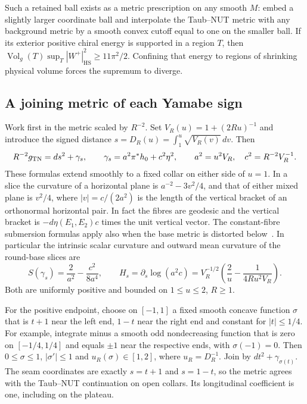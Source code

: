 \documentclass[11pt]{article}
\numberwithin{equation}{section}
\theoremstyle{definition}
\theoremstyle{remark}
\DeclareMathOperator{\Vol}{Vol}
\newcommand{\HS}{\mathrm{HS}}
\begin{document}
Such a retained ball exists as a metric prescription on any smooth
\(M\): embed a slightly larger coordinate ball and interpolate the
Taub--NUT metric with any background metric by a smooth convex cutoff
equal to one on the smaller ball. If its exterior positive chiral energy
is supported in a region \(T\), then
\(\Vol_g(T)\sup_T |W^+|_{\HS}^2\ge11\pi^2/2\). Confining that energy
to regions of shrinking physical volume forces the supremum to diverge.

\subsection{A joining metric of each Yamabe sign}

Work first in the metric scaled by \(R^{-2}\). Set \(V_R(u)=1+(2Ru)^{-1}\) and introduce the signed distance
\(s=D_R(u)=\int_1^u\sqrt{V_R(v)}\,dv\). Then
\[
 R^{-2}g_{\rm TN}=ds^2+\gamma_s,\qquad
 \gamma_s=a^2\pi^*h_0+c^2\eta^2,\qquad
 a^2=u^2V_R,\quad c^2=R^{-2}V_R^{-1}.
\]
These formulas extend smoothly to a fixed collar on either side
of \(u=1\). In a slice the curvature of a horizontal plane is
\(a^{-2}-3v^2/4\), and that of either mixed plane is \(v^2/4\),
where \(|v|=c/(2a^2)\) is the length of the vertical bracket of
an orthonormal horizontal pair. In fact the fibres are geodesic
and the vertical bracket is \(-d\eta(E_1,E_2)c\) times the unit
vertical vector. The constant-fibre submersion formulas apply
also when the base metric is distorted below~\cite[\S3, proof of Lemma 3.2]{ShankarTappTuschmann2005Circle}.
In particular the intrinsic scalar curvature and outward mean
curvature of the round-base slices are
\begin{equation}\label{wall:slice}
 S(\gamma_s)=\frac{2}{a^2}-\frac{c^2}{8a^4},\qquad
 H_s=\partial_s\log(a^2c)
 =V_R^{-1/2}\left(\frac2u-\frac{1}{4Ru^2V_R}\right).
\end{equation}
Both are uniformly positive and bounded on \(1\le u\le2\), \(R\ge1\).

For the positive endpoint, choose on \([-1,1]\) a fixed smooth
concave function \(\sigma\) that is \(t+1\) near the left end,
\(1-t\) near the right end and constant for \(|t|\le1/4\).
For example, integrate minus a smooth odd nondecreasing function
that is zero on \([-1/4,1/4]\) and equals \(\pm1\) near the respective
ends, with \(\sigma(-1)=0\). Then \(0\le\sigma\le1\),
\(|\sigma'|\le1\) and \(u_R(\sigma)\in[1,2]\), where \(u_R=D_R^{-1}\).
Join by \(dt^2+\gamma_{\sigma(t)}\). The seam coordinates are
exactly \(s=t+1\) and \(s=1-t\), so the metric agrees with the
Taub--NUT continuation on open collars. Its longitudinal
coefficient is one, including on the plateau.
\end{document}
